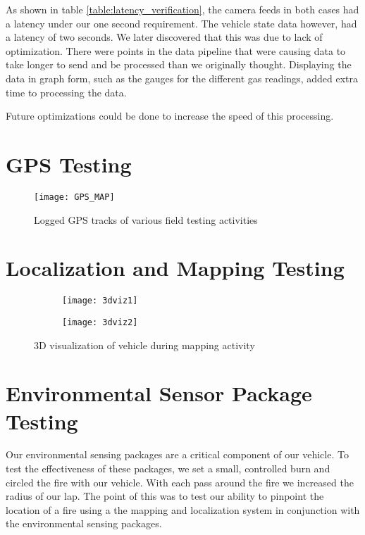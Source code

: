 As shown in table \ref{table:latency_verification}, the camera feeds in both cases had a latency under our one second requirement.  The vehicle state data however, had a latency of two seconds.  We later discovered that this was due to lack of optimization.  There were points in the data pipeline that were causing data to take longer to send and be processed than we originally thought.  Displaying the data in graph form, such as the gauges for the different gas readings, added extra time to processing the data.

Future optimizations could be done to increase the speed of this processing.

\section{GPS Testing}
\begin{figure}[H]
	\centerline{\texttt{[image: GPS\_MAP]}}
	\caption[]{Logged GPS tracks of various field testing activities}
	\label{fig:GPSMAP}
\end{figure}

\section{Localization and Mapping Testing}

\begin{figure}[H]
	\centering
	\begin{subfigure}{.5\textwidth}
		\centering
		\texttt{[image: 3dviz1]}
		\label{fig:3dviz1}
	\end{subfigure}%
	\begin{subfigure}{.5\textwidth}
		\centering
		\texttt{[image: 3dviz2]}
		\label{fig:3dviz2}
	\end{subfigure}
	\caption{3D visualization of vehicle during mapping activity}
	\label{fig:3dviz}
\end{figure}


\section{Environmental Sensor Package Testing}
Our environmental sensing packages are a critical component of our vehicle.  To test the effectiveness of these packages, we set a small, controlled burn and circled the fire with our vehicle.  With each pass around the fire we increased the radius of our lap.  The point of this was to test our ability to pinpoint the location of a fire using a the mapping and localization system in conjunction with the environmental sensing packages.

